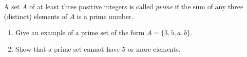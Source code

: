 A set \(A\) of at least three positive integers is called \emph{prime} if the sum of any three (distinct) elements of \(A\) is a prime number.
\begin{enumerate}
\item[(a)] Give an example of a prime set of the form \(A=\{3,5,a,b\}\).
\item[(b)] Show that a prime set cannot have \(5\) or more elements.
\end{enumerate}
